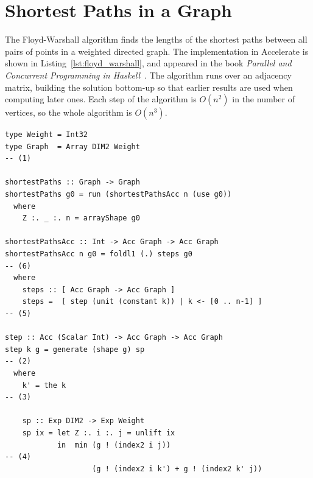 \section{Shortest Paths in a Graph}
\label{sec:floyd_warshall}

The Floyd-Warshall algorithm finds the lengths of the shortest paths between all
pairs of points in a weighted directed graph. The implementation in Accelerate
is shown in Listing~\ref{lst:floyd_warshall}, and appeared in the book
\emph{Parallel and Concurrent Programming in Haskell}~\cite{Marlow:2013wn}. The
algorithm runs over an adjacency matrix, building the solution bottom-up so that
earlier results are used when computing later ones. Each step of the algorithm
is $O\left(n^2\right)$ in the number of vertices, so the whole algorithm is
$O\left(n^3\right)$.

\begin{lstlisting}[style=haskell_float
    ,label=lst:floyd_warshall
    ,caption={[Floyd-Warshall shortest-paths algorithm]
        Floyd-Warshall shortest-paths algorithm~\cite{Marlow:2013wn}}]
type Weight = Int32
type Graph  = Array DIM2 Weight                                                        -- (1)

shortestPaths :: Graph -> Graph
shortestPaths g0 = run (shortestPathsAcc n (use g0))
  where
    Z :. _ :. n = arrayShape g0

shortestPathsAcc :: Int -> Acc Graph -> Acc Graph
shortestPathsAcc n g0 = foldl1 (.) steps g0                                            -- (6)
  where
    steps :: [ Acc Graph -> Acc Graph ]
    steps =  [ step (unit (constant k)) | k <- [0 .. n-1] ]                            -- (5)

step :: Acc (Scalar Int) -> Acc Graph -> Acc Graph
step k g = generate (shape g) sp                                                       -- (2)
  where
    k' = the k                                                                         -- (3)

    sp :: Exp DIM2 -> Exp Weight
    sp ix = let Z :. i :. j = unlift ix
            in  min (g ! (index2 i j))                                                 -- (4)
                    (g ! (index2 i k') + g ! (index2 k' j))
\end{lstlisting}

